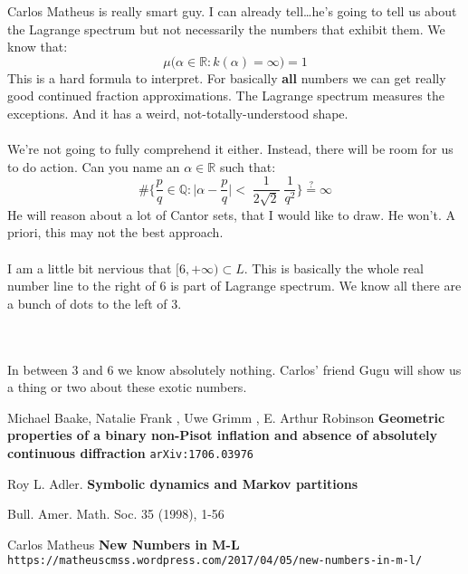 \documentclass[12pt]{article}
\begin{document}
\newpage

\noindent Carlos Matheus is really smart guy.  I can already tell\dots  he's going to tell us about the Lagrange spectrum but not necessarily the numbers that exhibit them. We know that: 
$$ \mu \big( \alpha \in \mathbb{R} : k(\alpha) = \infty \big) = 1 $$
This is a hard formula to interpret.  For basically \textbf{all} numbers we can get really good continued fraction approximations.  The Lagrange spectrum measures the exceptions.  And it has a weird, not-totally-understood shape.\\ \\
We're not going to fully comprehend it either.  Instead, there will be room for us to do action. Can  you name an $\alpha \in \mathbb{R}$ such that:
$$ \# \bigg\{ \frac{p}{q} \in \mathbb{Q} : \Big|  \alpha - \frac{p}{q} \Big| <  \;\frac{1}{2\sqrt{2}}\;\frac{1}{q^2} \bigg\} \stackrel{?}{=} \infty $$
He will reason about a lot of Cantor sets, that I would like to draw.  He won't. A priori, this may not the best approach.  \\ \\
I am a little bit nervious that $[6, +\infty) \subset L$.  This is basically the whole real number line to the right of 6 is part of Lagrange spectrum.  We know all there are a bunch of dots to the left of 3.   \\ \\
 \\ 
In between 3 and 6 we know absolutely nothing.  Carlos' friend Gugu will show us a thing or two about these exotic numbers.

\vfill 

\begin{thebibliography}{}

\item Michael Baake, Natalie Frank , Uwe Grimm , E. Arthur Robinson 
\textbf{Geometric properties of a binary non-Pisot inflation and absence of absolutely continuous diffraction} \texttt{arXiv:1706.03976} 

\item Roy L. Adler.  \textbf{Symbolic dynamics and Markov partitions}

Bull. Amer. Math. Soc. 35 (1998), 1-56 

\item Carlos Matheus \textbf{New Numbers in M-L}\\ \texttt{https://matheuscmss.wordpress.com/2017/04/05/new-numbers-in-m-l/}

\end{thebibliography}
\end{document}
